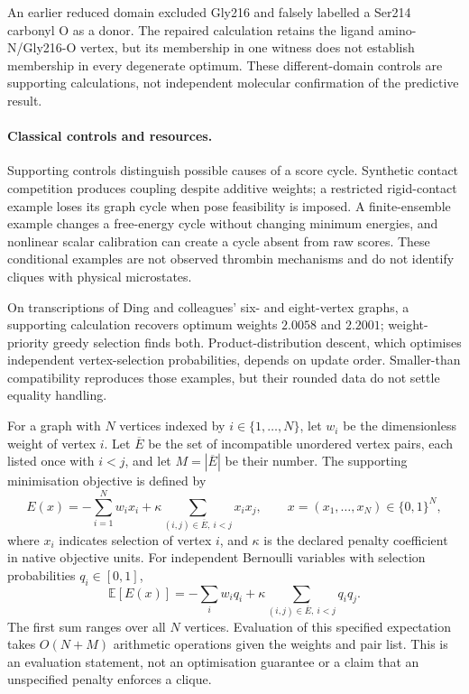 \documentclass{article}
\begin{document}
An earlier reduced domain excluded Gly216 and falsely labelled a Ser214 carbonyl O as a donor. The repaired calculation retains the ligand amino-N/Gly216-O vertex, but its membership in one witness does not establish membership in every degenerate optimum. These different-domain controls are supporting calculations, not independent molecular confirmation of the predictive result.

\paragraph{Classical controls and resources.}
Supporting controls distinguish possible causes of a score cycle. Synthetic contact competition produces coupling despite additive weights; a restricted rigid-contact example loses its graph cycle when pose feasibility is imposed. A finite-ensemble example changes a free-energy cycle without changing minimum energies, and nonlinear scalar calibration can create a cycle absent from raw scores. These conditional examples are not observed thrombin mechanisms and do not identify cliques with physical microstates.

On transcriptions of Ding and colleagues' six- and eight-vertex graphs, a supporting calculation recovers optimum weights \(2.0058\) and \(2.2001\); weight-priority greedy selection finds both. Product-distribution descent, which optimises independent vertex-selection probabilities, depends on update order. Smaller-than compatibility reproduces those examples, but their rounded data do not settle equality handling.

For a graph with \(N\) vertices indexed by \(i\in\{1,\ldots,N\}\), let \(w_i\) be the dimensionless weight of vertex \(i\). Let \(\overline E\) be the set of incompatible unordered vertex pairs, each listed once with \(i<j\), and let \(M=|\overline E|\) be their number. The supporting minimisation objective is defined by
\[
 E(x)=-\sum_{i=1}^N w_i x_i
       +\kappa\sum_{(i,j)\in\overline E,\ i<j}x_ix_j,
 \qquad x=(x_1,\ldots,x_N)\in\{0,1\}^N,
\]
where \(x_i\) indicates selection of vertex \(i\), and \(\kappa\) is the declared penalty coefficient in native objective units. For independent Bernoulli variables with selection probabilities \(q_i\in[0,1]\),
\[
 \mathbb E[E(x)]=-\sum_iw_iq_i
       +\kappa\sum_{(i,j)\in\overline E,\ i<j}q_iq_j.
\]
The first sum ranges over all \(N\) vertices. Evaluation of this specified expectation takes \(O(N+M)\) arithmetic operations given the weights and pair list. This is an evaluation statement, not an optimisation guarantee or a claim that an unspecified penalty enforces a clique.
\end{document}
